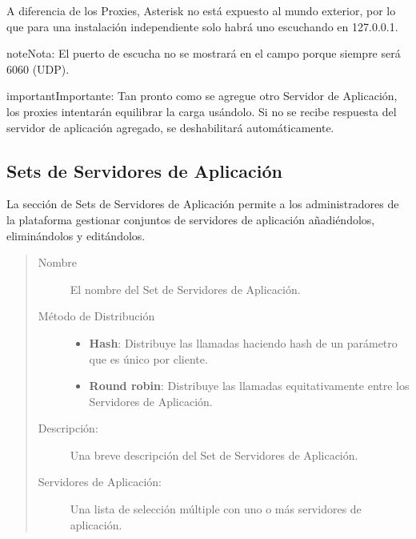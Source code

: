 \documentclass[letterpaper,10pt,spanish]{sphinxmanual}
\begin{document}
A diferencia de los Proxies, Asterisk no está expuesto al mundo exterior, por lo que para una instalación independiente solo habrá uno escuchando en 127.0.0.1.

\begin{notice}{note}{Nota:}
El puerto de escucha no se mostrará en el campo porque siempre será 6060 (UDP).
\end{notice}

\begin{notice}{important}{Importante:}
Tan pronto como se agregue otro Servidor de Aplicación, los proxies intentarán equilibrar la carga usándolo. Si no se recibe respuesta del servidor de aplicación agregado, se deshabilitará automáticamente.
\end{notice}


\subsection{Sets de Servidores de Aplicación}
\label{administration_portal/platform/infrastructure/application_server_sets:application-server-sets}\label{administration_portal/platform/infrastructure/application_server_sets::doc}
La sección de Sets de Servidores de Aplicación permite a los administradores de la plataforma gestionar conjuntos de servidores de aplicación añadiéndolos, eliminándolos y editándolos.
\begin{quote}
\begin{description}
\item[{Nombre}] \leavevmode
El nombre del Set de Servidores de Aplicación.

\item[{Método de Distribución}] \leavevmode\begin{itemize}
\item {} 
\textbf{Hash}: Distribuye las llamadas haciendo hash de un parámetro que es único por cliente.

\item {} 
\textbf{Round robin}: Distribuye las llamadas equitativamente entre los Servidores de Aplicación.

\end{itemize}

\item[{Descripción:}] \leavevmode
Una breve descripción del Set de Servidores de Aplicación.

\item[{Servidores de Aplicación:}] \leavevmode
Una lista de selección múltiple con uno o más servidores de aplicación.

\end{description}
\end{quote}
\end{document}
